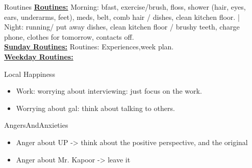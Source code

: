 \documentclass[serif, mathserif, final]{beamer}
\begin{document}
\begin{frame}
  \begin{columns}
    \begin{column}{0.25\linewidth}
      \begin{block}{Routines}
        { \tiny \underline{\bf Routines:} Morning: bfast, exercise/brush,
          floss, shower (hair, eyes, ears, underarms, feet), meds, belt,
          comb hair / dishes, clean kitchen floor. |  Night: running/ put
          away dishes, clean kitchen floor / brushy teeth, charge phone,
          clothes for tomorrow, contacts off.}\\ 
        {\tiny \underline{\bf Sunday Routines:} Routines: Experiences,week plan.}\\ 
        {\tiny \underline{\bf Weekday Routines:}}\\
      \end{block} 
      \begin{block}{Local Happiness}
        \begin{itemize} 
          \tiny \item \tiny Work: worrying about interviewing: just focus on the work. 
        \item \tiny Worrying about gal: think about talking to others. 
        \end{itemize}
      \end{block} 
      \begin{block}{AngersAndAnxieties}
        \begin{itemize}
          \tiny \item \tiny Anger about UP -> think about the positive
          perspective, and the original
        \item \tiny Anger about Mr. Kapoor ->  leave it

\end{itemize}
\end{block}
\end{column}
\end{columns}
\end{frame}
\end{document}
